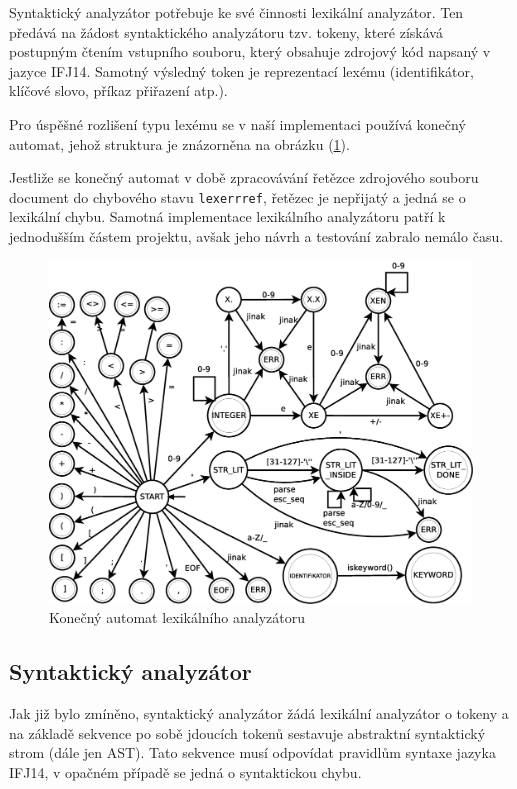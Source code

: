 \documentclass[12pt,a4paper,titlepage,final]{article}
\begin{document}
Syntaktický analyzátor potřebuje ke své činnosti lexikální analyzátor. Ten
předává na žádost syntaktického analyzátoru tzv. tokeny, které získává postupným
čtením vstupního souboru, který obsahuje zdrojový kód napsaný v jazyce IFJ14.
Samotný výsledný token je reprezentací lexému (identifikátor, klíčové slovo,
příkaz přiřazení atp.).

Pro úspěšné rozlišení typu lexému se v naší implementaci používá konečný
automat, jehož struktura je znázorněna na obrázku (\ref{lex_ka}).

Jestliže se konečný automat v době zpracovávání řetězce zdrojového souboru
document do chybového stavu \verb|lexerrref|, řetězec je nepřijatý a jedná se
o lexikální chybu. Samotná implementace lexikálního analyzátoru patří k
jednodušším částem projektu, avšak jeho návrh a testování zabralo nemálo času.

\begin{figure}[h!]\label{lex_ka}
	\centering
		\includegraphics[width=\linewidth]{../KA-scanner.eps}
	\caption{Konečný automat lexikálního analyzátoru}
\end{figure}

\subsection{Syntaktický analyzátor} \label{syntakticky_analyzator}
Jak již bylo zmíněno, syntaktický analyzátor žádá lexikální analyzátor o tokeny
a na základě sekvence po sobě jdoucích tokenů sestavuje abstraktní syntaktický
strom (dále jen AST). Tato sekvence musí odpovídat pravidlům syntaxe jazyka IFJ14,
v opačném případě se jedná o syntaktickou chybu.
\end{document}
